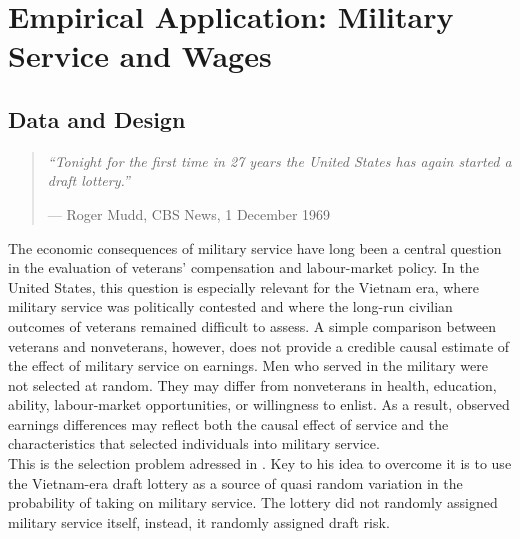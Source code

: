 \documentclass[12pt, a4paper, oneside]{article}
\theoremstyle{plain}
\theoremstyle{definition}
\begin{document}
\newpage

\section{Empirical Application: Military Service and Wages}
\label{sec:vietnam}

\subsection{Data and Design}
\label{subsec:vietnam_data}
\begin{quotation}
\noindent\textit{``Tonight for the first time in 27 years the United
States has again started a draft lottery.''}

\smallskip
\noindent\hfill --- Roger Mudd, CBS News, 1 December 1969
\end{quotation}
The economic consequences of military service have long been a central question in the evaluation of veterans' compensation and labour-market policy. In the United States, this question is especially relevant for the Vietnam era, where military service was politically contested and where the long-run civilian outcomes of veterans remained difficult to assess. A simple comparison between veterans and nonveterans, however, does not provide a credible causal estimate of the effect of military service on earnings. Men who served in the military were not selected at random. They may differ from nonveterans in health, education, ability, labour-market opportunities, or willingness to enlist. As a result, observed earnings differences may reflect both the causal effect of service and the characteristics that selected individuals into military service.\\
This is the selection problem adressed in \citet{angrist1990lifetime}.
Key to his idea to overcome it is to use the Vietnam-era draft lottery as a source of quasi random variation in the probability of taking on military service. 
The lottery did not randomly assigned military service itself, instead, it randomly assigned draft risk.
\end{document}
